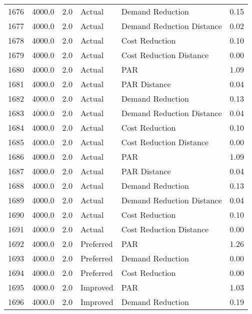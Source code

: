 \begin{longtable}{lrrllr}
1676 &       4000.0 &     2.0 &         Actual &           Demand Reduction &   0.15 \\
1677 &       4000.0 &     2.0 &         Actual &  Demand Reduction Distance &   0.02 \\
1678 &       4000.0 &     2.0 &         Actual &             Cost Reduction &   0.10 \\
1679 &       4000.0 &     2.0 &         Actual &    Cost Reduction Distance &   0.00 \\
1680 &       4000.0 &     2.0 &         Actual &                        PAR &   1.09 \\
1681 &       4000.0 &     2.0 &         Actual &               PAR Distance &   0.04 \\
1682 &       4000.0 &     2.0 &         Actual &           Demand Reduction &   0.13 \\
1683 &       4000.0 &     2.0 &         Actual &  Demand Reduction Distance &   0.04 \\
1684 &       4000.0 &     2.0 &         Actual &             Cost Reduction &   0.10 \\
1685 &       4000.0 &     2.0 &         Actual &    Cost Reduction Distance &   0.00 \\
1686 &       4000.0 &     2.0 &         Actual &                        PAR &   1.09 \\
1687 &       4000.0 &     2.0 &         Actual &               PAR Distance &   0.04 \\
1688 &       4000.0 &     2.0 &         Actual &           Demand Reduction &   0.13 \\
1689 &       4000.0 &     2.0 &         Actual &  Demand Reduction Distance &   0.04 \\
1690 &       4000.0 &     2.0 &         Actual &             Cost Reduction &   0.10 \\
1691 &       4000.0 &     2.0 &         Actual &    Cost Reduction Distance &   0.00 \\
1692 &       4000.0 &     2.0 &      Preferred &                        PAR &   1.26 \\
1693 &       4000.0 &     2.0 &      Preferred &           Demand Reduction &   0.00 \\
1694 &       4000.0 &     2.0 &      Preferred &             Cost Reduction &   0.00 \\
1695 &       4000.0 &     2.0 &       Improved &                        PAR &   1.03 \\
1696 &       4000.0 &     2.0 &       Improved &           Demand Reduction &   0.19 \\

\end{longtable}
